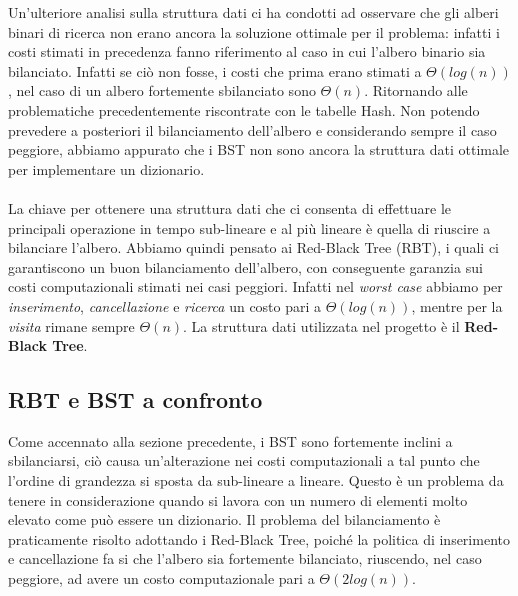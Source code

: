 \documentclass[paper=a4, fontsize=11pt,twoside]{scrartcl}   %
\begin{document}
				 Un'ulteriore analisi sulla struttura dati ci ha condotti ad osservare che gli alberi binari di ricerca non erano ancora la soluzione ottimale per il problema: infatti i costi stimati in precedenza fanno riferimento al caso in cui l'albero binario sia bilanciato. Infatti se ciò non fosse, i costi che prima erano stimati a $\Theta(log(n))$, nel caso di un albero fortemente sbilanciato sono $\Theta(n)$. Ritornando alle problematiche precedentemente riscontrate con le tabelle Hash. Non potendo prevedere a posteriori il bilanciamento dell'albero e considerando sempre il caso peggiore, abbiamo appurato che i BST non sono ancora la struttura dati ottimale per implementare un dizionario.\\\\
				 La chiave per ottenere una struttura dati che ci consenta di effettuare le principali operazione in tempo sub-lineare e al più lineare è quella di riuscire a bilanciare l'albero.
				 Abbiamo quindi pensato ai Red-Black Tree (RBT), i quali ci garantiscono un buon bilanciamento dell'albero, con conseguente garanzia sui costi computazionali stimati nei casi peggiori. Infatti nel \textit{worst case} abbiamo 
				 per \textit{inserimento}, \textit{cancellazione} e \textit{ricerca} un costo pari a $\Theta(log(n))$, mentre per la \textit{visita} rimane sempre $\Theta(n)$. La struttura dati utilizzata nel progetto è il \textbf{Red-Black Tree}.
				 
			\subsection{RBT e BST a confronto}
				Come accennato alla sezione precedente, i BST sono fortemente inclini a sbilanciarsi, ciò causa un'alterazione nei costi computazionali a tal punto che l'ordine di grandezza si sposta da sub-lineare a lineare. Questo è un problema da tenere in considerazione quando si lavora con un numero di elementi molto elevato come può essere un dizionario.
				Il problema del bilanciamento è praticamente risolto adottando i Red-Black Tree, poiché la politica di inserimento e cancellazione fa si che l'albero sia fortemente bilanciato, riuscendo, nel caso peggiore, ad avere un costo computazionale pari a $\Theta(2log(n))$.			
\end{document}

